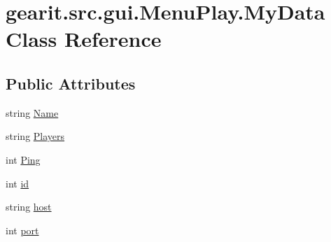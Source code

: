 \hypertarget{classgearit_1_1src_1_1gui_1_1_menu_play_1_1_my_data}{\section{gearit.\+src.\+gui.\+Menu\+Play.\+My\+Data Class Reference}
\label{classgearit_1_1src_1_1gui_1_1_menu_play_1_1_my_data}
}
\subsection*{Public Attributes}
\begin{DoxyCompactItemize}
\item 
string \hyperlink{classgearit_1_1src_1_1gui_1_1_menu_play_1_1_my_data_a15e69eb94251515b0f50b51832461497}{Name}
\item 
string \hyperlink{classgearit_1_1src_1_1gui_1_1_menu_play_1_1_my_data_ae52efdc3b3bda68d50ddbc82416d1b35}{Players}
\item 
int \hyperlink{classgearit_1_1src_1_1gui_1_1_menu_play_1_1_my_data_af7b4f5cb198caa2d7b29f4c15c4ca7e0}{Ping}
\item 
int \hyperlink{classgearit_1_1src_1_1gui_1_1_menu_play_1_1_my_data_ad107f50847fdec7b97aa36ae66a14259}{id}
\item 
string \hyperlink{classgearit_1_1src_1_1gui_1_1_menu_play_1_1_my_data_ad468a2cd5703bb2e99ce4ef2f63b6aec}{host}
\item 
int \hyperlink{classgearit_1_1src_1_1gui_1_1_menu_play_1_1_my_data_aaa422baeeac11f7ef23e08f18299df28}{port}
\end{DoxyCompactItemize}


